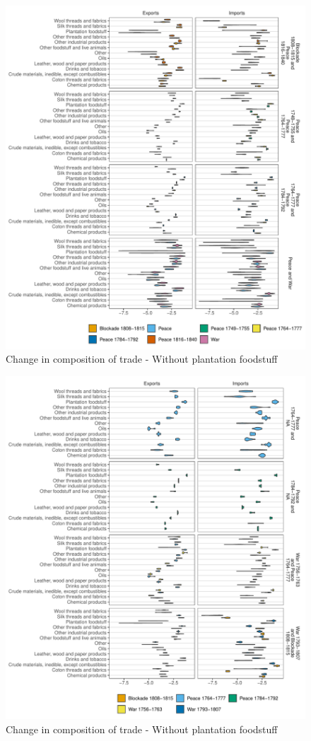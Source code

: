 \documentclass[12pt,a4paper,notitlepage,english]{article}
\begin{document}
\begin{appendix}
\begin{figure}[h!]
\caption{Change in composition of trade - Without plantation foodstuff}
\label{fig:violin_nat_sitc0_XI1}
\includegraphics[scale=.9]{violin_nat_sitc0_XI1}
\end{figure}
\begin{figure}[h!]
\caption{Change in composition of trade - Without plantation foodstuff}
\label{fig:violin_nat_sitc0_XI2}
\includegraphics[scale=.9]{violin_nat_sitc0_XI2}
\end{figure}



\end{appendix}
\end{document}
